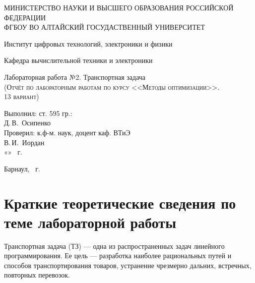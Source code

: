 \documentclass[a4paper, 12pt]{article}
\begin{document}
\begin{titlepage}
  \begin{center}
    \MakeUppercase{Министерство науки и высшего образования Российской Федерации} \\
    \MakeUppercase{ФГБОУ ВО Алтайский госудаственный университет}
    \vspace{0.25cm}
    
	  Институт цифровых технологий, электроники и физики
    
    Кафедра вычислительной техники и электроники
    \vfill
    
    {\LARGE Лабораторная работа №2. Транспортная задача}\\[5mm]
    \textsc{(Отчёт по лабораторным работам по курсу <<Методы оптимизации>>. \\13 вариант)}
  \bigskip

\end{center}
\vfill

\newlength{\ML}
\hfill
\begin{minipage}{0.45\textwidth}
  Выполнил: ст. 595 гр.:\\
  \underline{\hspace{\ML}} Д.\,В.~Осипенко\\
  Проверил: к.ф-м. наук, доцент каф. ВТиЭ\\
  \underline{\hspace{\ML}} В.\,И.~Иордан\\
  «\underline{\hspace{0.7cm}}» \underline{\hspace{2cm}} \the\year~г.
\end{minipage}%
\vfill

\begin{center}
  Барнаул, \the\year~г.
\end{center}
\end{titlepage}

\newpage
\section{Краткие теоретические сведения по теме лабораторной работы}
Транспортная задача (ТЗ) — одна из распространенных задач линейного программирования. Ее цель — разработка наиболее рациональных путей и способов транспортирования товаров, устранение чрезмерно дальних, встречных, повторных перевозок. 
\end{document}
